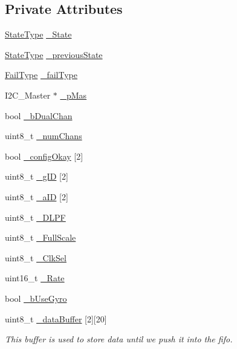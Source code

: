 \subsection*{Private Attributes}
\begin{DoxyCompactItemize}
\item 
\hyperlink{class_i_m_u_a7b5e1bf1cf1407b3e4cf0dd2e18b523f}{StateType} \hyperlink{class_i_m_u_a2e3c70d02cc2b3dd98ce8153d02cf04e}{\_\-State}
\item 
\hyperlink{class_i_m_u_a7b5e1bf1cf1407b3e4cf0dd2e18b523f}{StateType} \hyperlink{class_i_m_u_aca284ca1bcf10458005d4ca630833ea9}{\_\-previousState}
\item 
\hyperlink{class_i_m_u_a4edeb07a848734657792b4ef8749fb97}{FailType} \hyperlink{class_i_m_u_a39ed63b67b50c67520c5f8e5a2c26b26}{\_\-failType}
\item 
I2C\_\-Master $\ast$ \hyperlink{class_i_m_u_a466148932203b7250c83a4c5bb684ca1}{\_\-pMas}
\item 
bool \hyperlink{class_i_m_u_a62978e791838c3b4829e1d3d683e99b2}{\_\-bDualChan}
\item 
uint8\_\-t \hyperlink{class_i_m_u_a27df580b4559aaf3234469bfe16eb158}{\_\-numChans}
\item 
bool \hyperlink{class_i_m_u_a53aa928d2d68a5287da893bd157e7cbe}{\_\-configOkay} \mbox{[}2\mbox{]}
\item 
uint8\_\-t \hyperlink{class_i_m_u_a47ffe20a032e3a890cd3891793a60a40}{\_\-gID} \mbox{[}2\mbox{]}
\item 
uint8\_\-t \hyperlink{class_i_m_u_a10141bdc27465c95de6c8285d1542d78}{\_\-aID} \mbox{[}2\mbox{]}
\item 
uint8\_\-t \hyperlink{class_i_m_u_a3f9e6159234449cde8f5e72da8acf751}{\_\-DLPF}
\item 
uint8\_\-t \hyperlink{class_i_m_u_a059c02011a10bb90aecc9692ed345771}{\_\-FullScale}
\item 
uint8\_\-t \hyperlink{class_i_m_u_a4dbeaf17fd1ae9b41b5c3fe61706e5f1}{\_\-ClkSel}
\item 
uint16\_\-t \hyperlink{class_i_m_u_aafe9be107385c7ccedeb1539cf6d7fce}{\_\-Rate}
\item 
bool \hyperlink{class_i_m_u_a0cee90ebd5d0b57fa5ad3890c65108e2}{\_\-bUseGyro}
\item 
uint8\_\-t \hyperlink{class_i_m_u_ab87a54288295d4d10d605cf6c21d4d0f}{\_\-dataBuffer} \mbox{[}2\mbox{]}\mbox{[}20\mbox{]}
\begin{DoxyCompactList}\small\item\em This buffer is used to store data until we push it into the fifo. \item\end{DoxyCompactList}\item 

\end{DoxyCompactItemize}
